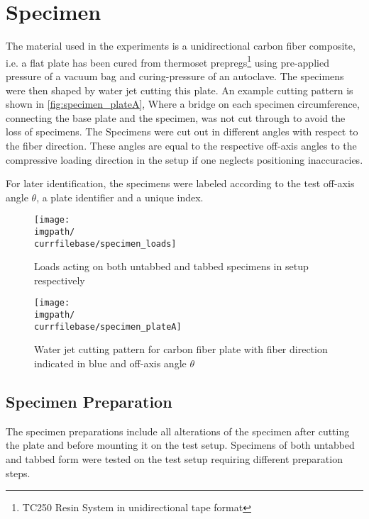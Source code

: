 \section{Specimen}
\label{sec:specimen}

The material used in the experiments is a unidirectional carbon fiber composite, i.e. a flat plate has been cured from thermoset prepregs\footnote{TC250 Resin System in unidirectional tape format} using pre-applied pressure of a vacuum bag and curing-pressure of an autoclave. The specimens were then shaped by water jet cutting this plate. An example cutting pattern is shown in \autoref{fig:specimen_plateA}, Where a bridge on each specimen circumference, connecting the base plate and the specimen, was not cut through to avoid the loss of specimens.
The Specimens were cut out in different angles with respect to the fiber direction. These angles are equal to the respective off-axis angles to the compressive loading direction in the setup if one neglects positioning inaccuracies.

For later identification, the specimens were labeled according to the test off-axis angle $\theta$, a plate identifier and a unique index.

\begin{figure}[!ht]
    \centering
    \texttt{[image: \\imgpath/\\currfilebase/specimen\_loads]}
    \caption{Loads acting on both untabbed and tabbed specimens in setup respectively}
    \label{fig:specimen_loads}
\end{figure}
\begin{figure}[!ht]
    \centering
    \texttt{[image: \\imgpath/\\currfilebase/specimen\_plateA]}
    \caption{Water jet cutting pattern for carbon fiber plate with fiber direction indicated in blue and off-axis angle $\theta$}
    \label{fig:specimen_plateA}
\end{figure}

\newpage
\subsection{Specimen Preparation}
\label{subsec:spec_prep}

The specimen preparations include all alterations of the specimen after cutting the plate and before mounting it on the test setup. Specimens of both untabbed and tabbed form were tested on the test setup requiring different preparation steps.


